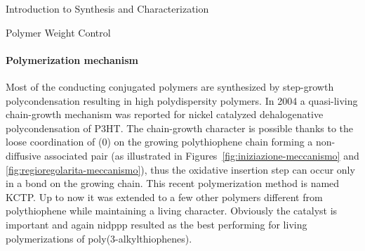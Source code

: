 \begin{section}{Introduction to Synthesis and Characterization}
\begin{subsection}{Polymer Weight Control}
\paragraph{Polymerization mechanism} \label{kctp} Most of the conducting conjugated polymers are synthesized by step-growth poly\-condensation resulting in high polydispersity polymers. 
In 2004 a quasi-living 
chain-growth 
mechanism was reported for nickel catalyzed de\-halogenative polycondensation of \acrfull{P3HT}. 
The chain-growth character is possible thanks to the loose coordination of (0) on the growing polythiophene chain forming a non-diffusive associated pair (as illustrated in Figures~\ref{fig:iniziazione-meccanismo} and \ref{fig:regioregolarita-meccanismo}), thus the oxidative insertion step can occur only in a  bond on the growing chain. This recent polymerization method is named \gls{KCTP}. 
Up to now it was extended to a few other polymers different from polythiophene while maintaining a living character. Obviously the catalyst is important and again \gls{nidppp} resulted as the best performing for living poly\-merizations of poly(3-alkyl\-thio\-phenes).


\end{subsection}
\end{section}
